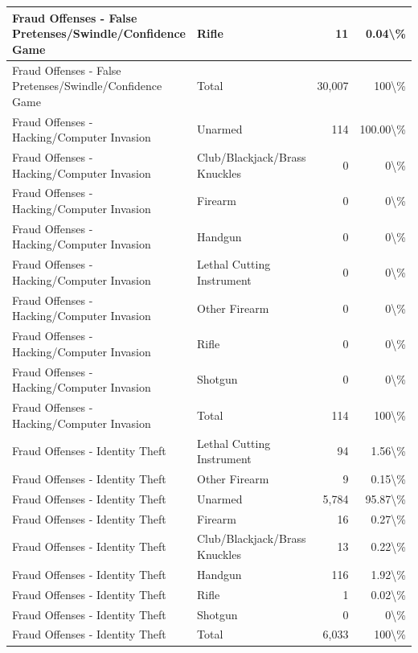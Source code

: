 \documentclass[
]{krantz}
\begin{document}
\begin{longtable}[t]{l|l|r|r}
\hline
Fraud Offenses - False Pretenses/Swindle/Confidence Game & Rifle & 11 & 0.04\textbackslash{}\%\\
\hline
Fraud Offenses - False Pretenses/Swindle/Confidence Game & Total & 30,007 & 100\textbackslash{}\%\\
\hline
Fraud Offenses - Hacking/Computer Invasion & Unarmed & 114 & 100.00\textbackslash{}\%\\
\hline
Fraud Offenses - Hacking/Computer Invasion & Club/Blackjack/Brass Knuckles & 0 & 0\textbackslash{}\%\\
\hline
Fraud Offenses - Hacking/Computer Invasion & Firearm & 0 & 0\textbackslash{}\%\\
\hline
Fraud Offenses - Hacking/Computer Invasion & Handgun & 0 & 0\textbackslash{}\%\\
\hline
Fraud Offenses - Hacking/Computer Invasion & Lethal Cutting Instrument & 0 & 0\textbackslash{}\%\\
\hline
Fraud Offenses - Hacking/Computer Invasion & Other Firearm & 0 & 0\textbackslash{}\%\\
\hline
Fraud Offenses - Hacking/Computer Invasion & Rifle & 0 & 0\textbackslash{}\%\\
\hline
Fraud Offenses - Hacking/Computer Invasion & Shotgun & 0 & 0\textbackslash{}\%\\
\hline
Fraud Offenses - Hacking/Computer Invasion & Total & 114 & 100\textbackslash{}\%\\
\hline
Fraud Offenses - Identity Theft & Lethal Cutting Instrument & 94 & 1.56\textbackslash{}\%\\
\hline
Fraud Offenses - Identity Theft & Other Firearm & 9 & 0.15\textbackslash{}\%\\
\hline
Fraud Offenses - Identity Theft & Unarmed & 5,784 & 95.87\textbackslash{}\%\\
\hline
Fraud Offenses - Identity Theft & Firearm & 16 & 0.27\textbackslash{}\%\\
\hline
Fraud Offenses - Identity Theft & Club/Blackjack/Brass Knuckles & 13 & 0.22\textbackslash{}\%\\
\hline
Fraud Offenses - Identity Theft & Handgun & 116 & 1.92\textbackslash{}\%\\
\hline
Fraud Offenses - Identity Theft & Rifle & 1 & 0.02\textbackslash{}\%\\
\hline
Fraud Offenses - Identity Theft & Shotgun & 0 & 0\textbackslash{}\%\\
\hline
Fraud Offenses - Identity Theft & Total & 6,033 & 100\textbackslash{}\%\\

\end{longtable}
\end{document}
